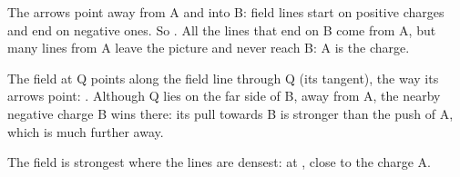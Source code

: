 \begin{abcliste}
\abc The arrows point away from A and into B: field lines start on positive charges and end on negative ones. So . All the lines that end on B come from A, but many lines from A leave the picture and never reach B: A is the  charge.

\abc The field at Q points along the field line through Q (its tangent), the way its arrows point: . Although Q lies on the far side of B, away from A, the nearby negative charge B wins there: its pull towards B is stronger than the push of A, which is much further away.

\abc The field is strongest where the lines are densest: at , close to the charge A.
\end{abcliste}

